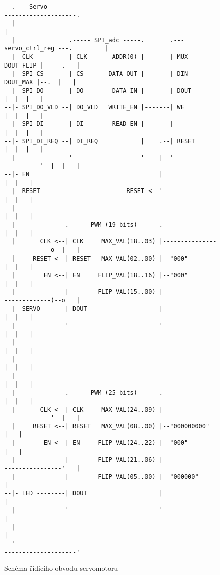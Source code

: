 \begin{figure}[h]
\caption{Schéma řídicího obvodu servomotoru}
\centering
\begin{Verbatim}
  .--- Servo ------------------------------------------------------------------.
  |                                                                            |
  |               .----- SPI_adc -----.       .--- servo_ctrl_reg ---.         |
--|- CLK ---------| CLK       ADDR(0) |-------| MUX        DOUT_FLIP |-----.   |
--|- SPI_CS ------| CS       DATA_OUT |-------| DIN         DOUT_MAX |--.  |   |
--|- SPI_DO ------| DO        DATA_IN |-------| DOUT                 |  |  |   |
--|- SPI_DO_VLD --| DO_VLD   WRITE_EN |-------| WE                   |  |  |   |
--|- SPI_DI ------| DI        READ_EN |--     |                      |  |  |   |
--|- SPI_DI_REQ --| DI_REQ            |    .--| RESET                |  |  |   |
  |               '-------------------'    |  '----------------------'  |  |   |
--|- EN                                    |                            |  |   |
--|- RESET                        RESET <--'                            |  |   |
  |                                                                     |  |   |
  |              .----- PWM (19 bits) -----.                            |  |   |
  |       CLK <--| CLK     MAX_VAL(18..03) |----------------------------o  |   |
  |     RESET <--| RESET   MAX_VAL(02..00) |--"000"                     |  |   |
  |        EN <--| EN     FLIP_VAL(18..16) |--"000"                     |  |   |
  |              |        FLIP_VAL(15..00) |----------------------------)--o   |
--|- SERVO ------| DOUT                    |                            |  |   |
  |              '-------------------------'                            |  |   |
  |                                                                     |  |   |
  |                                                                     |  |   |
  |                                                                     |  |   |
  |              .----- PWM (25 bits) -----.                            |  |   |
  |       CLK <--| CLK     MAX_VAL(24..09) |----------------------------'  |   |
  |     RESET <--| RESET   MAX_VAL(08..00) |--"000000000"                  |   |
  |        EN <--| EN     FLIP_VAL(24..22) |--"000"                        |   |
  |              |        FLIP_VAL(21..06) |-------------------------------'   |
  |              |        FLIP_VAL(05..00) |--"000000"                         |
--|- LED --------| DOUT                    |                                   |
  |              '-------------------------'                                   |
  |                                                                            |
  '----------------------------------------------------------------------------'
\end{Verbatim}
\end{figure}



